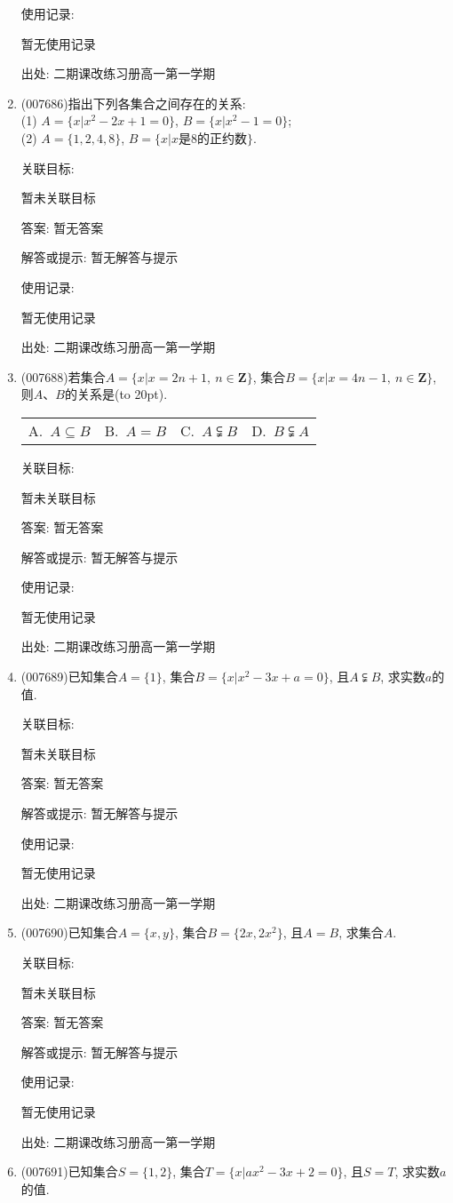 \documentclass[10pt,a4paper]{article}
\newcommand{\bracket}[1]{(\hbox to #1pt{})}
\newcommand{\fourch}[4]{\par\begin{tabular}{p{.23\textwidth}p{.23\textwidth}p{.23\textwidth}p{.23\textwidth}}
A.~#1 &B.~#2& C.~#3& D.~#4
\end{tabular}}
\begin{document}
\begin{enumerate}[1.]
使用记录:

暂无使用记录


出处: 二期课改练习册高一第一学期
\item { (007686)}指出下列各集合之间存在的关系:\\
(1) $A=\{x|x^2-2x+1=0\}$, $B=\{x|x^2-1=0\}$;\\
(2) $A=\{1,2,4,8\}$, $B=\{x|x\text{是}8\text{的正约数}\}$.


关联目标:

暂未关联目标

答案: 暂无答案

解答或提示: 暂无解答与提示

使用记录:

暂无使用记录


出处: 二期课改练习册高一第一学期
\item { (007688)}若集合$A=\{x|x=2n+1, \ n\in \mathbf{Z}\}$, 集合$B=\{x|x=4n-1, \ n\in \mathbf{Z}\}$, 则$A$、$B$的关系是\bracket{20}.
\fourch{$A\subseteq B$}{$A=B$}{$A\subsetneqq B$}{$B\subsetneqq A$}


关联目标:

暂未关联目标

答案: 暂无答案

解答或提示: 暂无解答与提示

使用记录:

暂无使用记录


出处: 二期课改练习册高一第一学期
\item { (007689)}已知集合$A=\{1\}$, 集合$B=\{x|x^2-3x+a=0\}$, 且$A\subsetneqq B$, 求实数$a$的值.


关联目标:

暂未关联目标

答案: 暂无答案

解答或提示: 暂无解答与提示

使用记录:

暂无使用记录


出处: 二期课改练习册高一第一学期
\item { (007690)}已知集合$A=\{x,y\}$, 集合$B=\{2x,2x^2\}$, 且$A=B$, 求集合$A$.


关联目标:

暂未关联目标

答案: 暂无答案

解答或提示: 暂无解答与提示

使用记录:

暂无使用记录


出处: 二期课改练习册高一第一学期
\item { (007691)}已知集合$S=\{1,2\}$, 集合$T=\{x|ax^2-3x+2=0\}$, 且$S=T$, 求实数$a$的值.



\end{enumerate}
\end{document}
